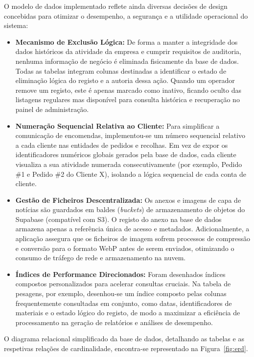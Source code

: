 O modelo de dados implementado reflete ainda diversas decisões de design concebidas para otimizar o desempenho, a segurança e a utilidade operacional do sistema:
\begin{itemize}
    \item \textbf{Mecanismo de Exclusão Lógica:} De forma a manter a integridade dos dados históricos da atividade da empresa e cumprir requisitos de auditoria, nenhuma informação de negócio é eliminada fisicamente da base de dados. Todas as tabelas integram colunas destinadas a identificar o estado de eliminação lógica do registo e a autoria dessa ação. Quando um operador remove um registo, este é apenas marcado como inativo, ficando oculto das listagens regulares mas disponível para consulta histórica e recuperação no painel de administração.
    \item \textbf{Numeração Sequencial Relativa ao Cliente:} Para simplificar a comunicação de encomendas, implementou-se um número sequencial relativo a cada cliente nas entidades de pedidos e recolhas. Em vez de expor os identificadores numéricos globais gerados pela base de dados, cada cliente visualiza a sua atividade numerada consecutivamente (por exemplo, Pedido \#1 e Pedido \#2 do Cliente X), isolando a lógica sequencial de cada conta de cliente.
    \item \textbf{Gestão de Ficheiros Descentralizada:} Os anexos e imagens de capa de notícias são guardados em baldes (\textit{buckets}) de armazenamento de objetos do Supabase (compatível com S3). O registo do anexo na base de dados armazena apenas a referência única de acesso e metadados. Adicionalmente, a aplicação assegura que os ficheiros de imagem sofrem processos de compressão e conversão para o formato WebP antes de serem enviados, otimizando o consumo de tráfego de rede e armazenamento na nuvem.
    \item \textbf{Índices de Performance Direcionados:} Foram desenhados índices compostos personalizados para acelerar consultas cruciais. Na tabela de pesagens, por exemplo, desenhou-se um índice composto pelas colunas frequentemente consultadas em conjunto, como datas, identificadores de materiais e o estado lógico do registo, de modo a maximizar a eficiência de processamento na geração de relatórios e análises de desempenho.
\end{itemize}

O diagrama relacional simplificado da base de dados, detalhando as tabelas e as respetivas relações de cardinalidade, encontra-se representado na Figura~\ref{fig:erd}.

